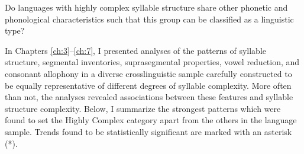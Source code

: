\ea\label{ex:8.1}
   {Do languages with highly complex syllable structure share other phonetic and phonological characteristics such that this group can be classified as a linguistic type?}
\z

  In Chapters \ref{ch:3}--\ref{ch:7}, I presented analyses of the patterns of syllable structure, segmental inventories, suprasegmental properties, vowel reduction, and consonant allophony in a diverse crosslinguistic sample carefully constructed to be equally representative of different degrees of syllable complexity. More often than not, the analyses revealed associations between these features and syllable structure complexity. Below, I summarize the strongest patterns which were found to set the Highly Complex category apart from the others in the language sample. Trends found to be statistically significant are marked with an asterisk (*).

